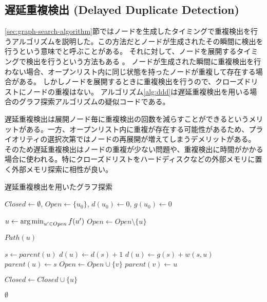 \subsection{遅延重複検出 (Delayed Duplicate Detection)}
\label{sec:delayed-duplicate-detection}

\ref{sec:graph-search-algorithm}節ではノードを生成したタイミングで重複検出を行うアルゴリズムを説明した。この方法だとノードが生成されたその瞬間に検出を行うという意味でと呼ぶことがある。
それに対して、ノードを展開するタイミングで検出を行うという方法もある \cite{korf2003delayed}。
ノードが生成された瞬間に重複検出を行わない場合、オープンリスト内に同じ状態を持ったノードが重複して存在する場合がある。
しかしノードを展開するときに重複検出を行うので、クローズドリストにノードの重複はない。
アルゴリズム\ref{alg:ddd}は遅延重複検出を用いる場合のグラフ探索アルゴリズムの疑似コードである。

遅延重複検出は展開ノード毎に重複検出の回数を減らすことができるというメリットがある。一方、オープンリスト内に重複が存在する可能性があるため、プライオリティの選択次第ではノードの再展開が増えてしまうデメリットがある。
そのため遅延重複検出はノードの重複が少ない問題や、重複検出に時間がかかる場合に使われる。特にクローズドリストをハードディスクなどの外部メモリに置く外部メモリ探索に相性が良い。


\begin{algorithm}
\caption{遅延重複検出を用いたグラフ探索}
\label{alg:ddd}
	$Closed \leftarrow \emptyset$, $Open \leftarrow \{u_0\}$, $d(u_0) \leftarrow 0$, $g(u_0) \leftarrow 0$\;
	 {
                $u \leftarrow \operatorname*{arg\,min}_{u' \in Open} f(u')$ \;
	        $Open \leftarrow Open \setminus \{u\} $\;
          
		 {
			\Return $Path(u)$\;
		}

                $s \leftarrow parent(u)$\;
		 {
                  $d(u) \leftarrow d(s) + 1$\;
                  $d(u) \leftarrow g(s) + w(s, u)$\;
		  $parent(u) \leftarrow s$\;
		   {
		    $Open \leftarrow Open \cup \{v\}$\;
		    $parent(v) \leftarrow u$\;
		  }
		}

                 {
                  $Closed \leftarrow Closed \cup \{u\}$\;
                }
 	}
	\Return $\emptyset$\;
\end{algorithm}


% 
% 


